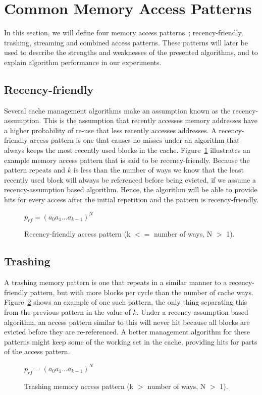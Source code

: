 \section{Common Memory Access Patterns}

In this section, we will define four memory access patterns~\cite{Jaleel2010}; recency-friendly, trashing, streaming and combined access patterns.
These patterns will later be used to describe the strengths and weaknesses of the presented algorithms, and to explain algorithm performance in our experiments.

\subsection{Recency-friendly}
Several cache management algorithms make an assumption known as the recency-assumption.
This is the assumption that recently accesses memory addresses have a higher probability of re-use that less recently accesses addresses.
A recency-friendly access pattern is one that causes no misses under an algorithm that always keeps the most recently used blocks in the cache.
Figure~\ref{fig:algorithms:rf_pattern} illustrates an example memory access pattern that is said to be recency-friendly.
Because the pattern repeats and $k$ is less than the number of ways we know that the least recently used block will always be referenced before being evicted, if we assume a recency-assumption based algorithm.
Hence, the algorithm will be able to provide hits for every access after the initial repetition and the pattern is recency-friendly.

\begin{figure}[ht]
\centering
$p_{rf} = (a_0 a_1 ... a_{k-1})^N$
\label{fig:algorithms:rf_pattern}
\caption[Recency-friendly access pattern.]{Recency-friendly access pattern (k $<=$ number of ways, N $>$ 1).}
\end{figure}

\subsection{Trashing}
A trashing memory pattern is one that repeats in a similar manner to a recency-friendly pattern, but with more blocks per cycle than the number of cache ways. 
Figure~\ref{fig:algorithms:tr_pattern} shows an example of one such pattern, the only thing separating this from the previous pattern in the value of $k$.
Under a recency-assumption based algorithm, an access pattern similar to this will never hit because all blocks are evicted before they are re-referenced.
A better management algorithm for these patterns might keep some of the working set in the cache, providing hits for parts of the access pattern.
\begin{figure}[ht]
\centering
$p_{rf} = (a_0 a_1 ... a_{k-1})^N$
\label{fig:algorithms:tr_pattern}
\caption[Trashing memory access pattern.]{Trashing memory access pattern (k $>$ number of ways, N $>$ 1).}
\end{figure}

